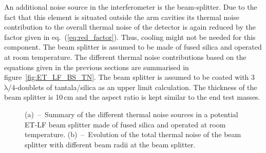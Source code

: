An additional noise source in the interferometer is the beam-splitter. Due to the fact that this element is situated outside the arm cavities its thermal noise contribution to the overall thermal noise of the detector is again reduced by the factor given in eq.~(\ref{eq:red_factor}). Thus, cooling might not be needed for this component. The beam splitter is assumed to be made of fused silica and operated at room temperature. The different thermal noise contributions based on the equations given in the previous sections are summarised in figure~\ref{fig:ET_LF_BS_TN}. The beam splitter is assumed to be coated with 3 $\mathrm{\lambda/4}$-doublets of tantala/silica as an upper limit calculation. The thickness of the beam splitter is 10\,cm and the aspect ratio is kept similar to the end test masses. 

\begin{figure}[!h]
\begin{center}
\end{center}
\caption{(a)~--~Summary of the different thermal noise sources in a potential ET-LF beam splitter made of fused silica and operated at room temperature. (b)~--~Evolution of the total thermal noise of the beam splitter with different beam radii at the beam splitter.}
\end{figure}

